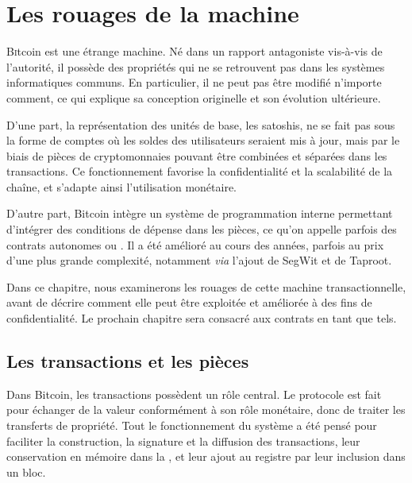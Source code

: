 
\chapter{Les rouages de la machine}
\label{ch:rouages}
\label{enotezch:12}

\lettrine[]{B}itcoin est une étrange machine. Né dans un rapport antagoniste vis-à-vis de l'autorité, il possède des propriétés qui ne se retrouvent pas dans les systèmes informatiques communs. En particulier, il ne peut pas être modifié n'importe comment, ce qui explique sa conception originelle et son évolution ultérieure.

D'une part, la représentation des unités de base, les satoshis, ne se fait pas sous la forme de comptes où les soldes des utilisateurs seraient mis à jour, mais par le biais de pièces de cryptomonnaies pouvant être combinées et séparées dans les transactions. Ce fonctionnement favorise la confidentialité et la scalabilité de la chaîne, et s'adapte ainsi l'utilisation monétaire.

D'autre part, Bitcoin intègre un système de programmation interne permettant d'intégrer des conditions de dépense dans les pièces, ce qu'on appelle parfois des contrats autonomes ou . Il a été amélioré au cours des années, parfois au prix d'une plus grande complexité, notamment \emph{via} l'ajout de SegWit et de Taproot.

Dans ce chapitre, nous examinerons les rouages de cette machine transactionnelle, avant de décrire comment elle peut être exploitée et améliorée à des fins de confidentialité. Le prochain chapitre sera consacré aux contrats en tant que tels.

\section*{Les transactions et les pièces} %

Dans Bitcoin, les transactions possèdent un rôle central. Le protocole est fait pour échanger de la valeur conformément à son rôle monétaire, donc de traiter les transferts de propriété. Tout le fonctionnement du système a été pensé pour faciliter la construction, la signature et la diffusion des transactions, leur conservation en mémoire dans la , et leur ajout au registre par leur inclusion dans un bloc.

